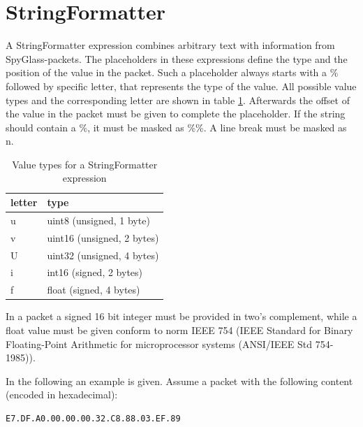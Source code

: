 \newpage
\section{StringFormatter}
\label{section:stringformatter}

A StringFormatter expression combines arbitrary text with information from SpyGlass-packets. The placeholders
in these expressions define the type and the position of the value in the packet. Such a placeholder always
starts with a \% followed by specific letter, that represents the type of the value. All possible value types
and the corresponding letter are shown in table \ref{table:stringformatter_types}. Afterwards the
offset of the value in the packet must be given to complete the placeholder. If the string should contain
a \%, it must be masked as \%\%. A line break must be masked as \\n.

\begin{table}[htdp]
  \begin{center}
    \begin{tabular}{l|l}
      \textbf{letter} & \textbf{type}\\
      \hline
      \hline
      u & uint8 (unsigned, 1 byte) \\
      \hline
      v & uint16 (unsigned, 2 bytes) \\
      \hline
      U & uint32 (unsigned, 4 bytes)\\
      \hline
      i & int16 (signed, 2 bytes)\\
      \hline
      f & float (signed, 4 bytes)\\
    \end{tabular}
    \caption{Value types for a StringFormatter expression}
    \label{table:stringformatter_types}
  \end{center}
\end{table}

In a packet a signed 16 bit integer must be provided in two's complement, while a float value must be given conform to norm
IEEE 754 (IEEE Standard for Binary Floating-Point Arithmetic for microprocessor systems (ANSI/IEEE Std 754-1985)).

In the following an example is given. Assume a packet with the following content (encoded in hexadecimal):

\begin{verbatim}
E7.DF.A0.00.00.00.32.C8.88.03.EF.89
\end{verbatim}

